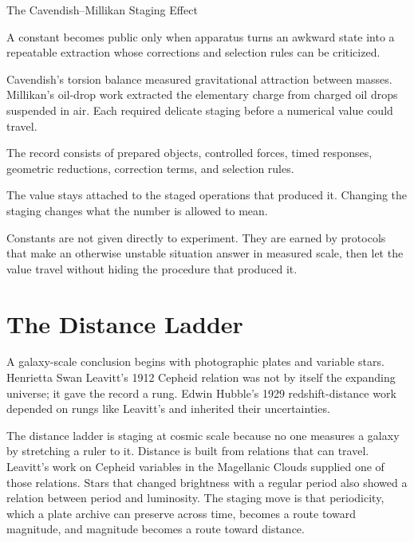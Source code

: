 \begin{phenom}{The Cavendish--Millikan Staging Effect~\cite{cavendish1798,millikan1913}}
\label{ph:cavendish-millikan-staging}

\PhStatement
A constant becomes public only when apparatus turns an awkward state into a
repeatable extraction whose corrections and selection rules can be criticized.

\PhOrigin
Cavendish's torsion balance measured gravitational attraction between masses.
Millikan's oil-drop work extracted the elementary charge from charged oil
drops suspended in air. Each required delicate staging before a numerical
value could travel.

\PhObservation
The record consists of prepared objects, controlled forces, timed responses,
geometric reductions, correction terms, and selection rules.

\PhConstraint
The value stays attached to the staged operations that produced it. Changing
the staging changes what the number is allowed to mean.

\PhConsequence
Constants are not given directly to experiment. They are earned by protocols
that make an otherwise unstable situation answer in measured scale, then let
the value travel without hiding the procedure that produced it.
\end{phenom}

\section{The Distance Ladder}

A galaxy-scale conclusion begins with photographic plates and variable
stars. Henrietta Swan Leavitt's 1912 Cepheid relation was not by itself the
expanding universe; it gave the record a rung. Edwin Hubble's 1929
redshift-distance work depended on rungs like Leavitt's and inherited their
uncertainties.

The distance ladder is staging at cosmic scale because no one measures a
galaxy by stretching a ruler to it. Distance is built from relations that
can travel. Leavitt's work on Cepheid variables in the Magellanic Clouds
supplied one of those relations. Stars that changed brightness with a
regular period also showed a relation between period and luminosity. The
staging move is that periodicity, which a plate archive can preserve across
time, becomes a route toward magnitude, and magnitude becomes a route toward
distance.

